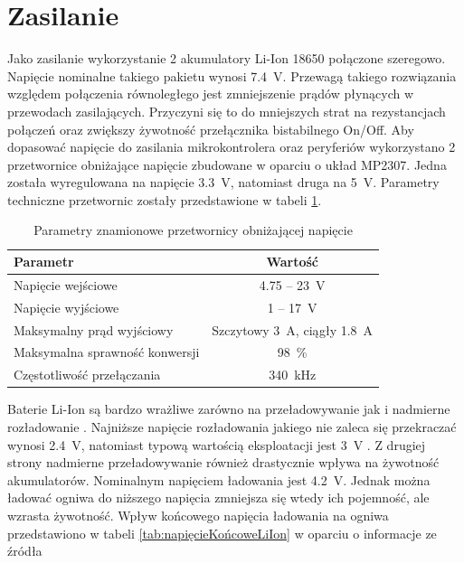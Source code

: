 	\section{Zasilanie}
	
		Jako zasilanie wykorzystanie 2 akumulatory Li-Ion 18650 połączone szeregowo. Napięcie nominalne takiego pakietu wynosi \SI{7.4}{\volt}. Przewagą takiego rozwiązania względem połączenia równoległego jest zmniejszenie prądów płynących w przewodach zasilających. Przyczyni się to do mniejszych strat na rezystancjach połączeń oraz zwiększy żywotność przełącznika bistabilnego On/Off. Aby dopasować napięcie do zasilania mikrokontrolera oraz peryferiów wykorzystano 2 przetwornice obniżające napięcie zbudowane w oparciu o układ MP2307. Jedna została wyregulowana na napięcie \SI{3.3}{\volt}, natomiast druga na \SI{5}{\volt}. Parametry techniczne przetwornic zostały przedstawione w tabeli \ref{tab:PrzetwornicaStepDown}.
		
		\begin{table}[ht]
			\centering
			\begin{tabular}{|l|c|} \hline
				\textbf{Parametr} & \textbf{Wartość} \\
				\hline
				\hline  Napięcie wejściowe & 4.75 -- \SI{23}{\volt}  \\
				\hline 	Napięcie wyjściowe & 1 -- \SI{17}{\volt} \\
				\hline 	Maksymalny prąd wyjściowy & Szczytowy \SI{3}{\ampere}, ciągły \SI{1.8}{\ampere} \\
				\hline 	Maksymalna sprawność konwersji & \SI{98}{\percent} \\
				\hline 	Częstotliwość przełączania & \SI{340}{\kHz} \\
				\hline
			\end{tabular}
			\caption{Parametry znamionowe przetwornicy obniżającej napięcie}
			\label{tab:PrzetwornicaStepDown}
		\end{table}
	
		Baterie Li-Ion są bardzo wrażliwe zarówno na przeładowywanie \cite{ladowanieLiIon} jak i nadmierne rozładowanie \cite{rozladowywanieLiIon1, rozladowywanieLiIon2}. Najniższe napięcie rozładowania jakiego nie zaleca się przekraczać wynosi \SI{2.4}{\volt}, natomiast typową wartością eksploatacji jest \SI{3}{\volt} \cite{rozladowywanieLiIon2}. Z drugiej strony nadmierne przeładowywanie również drastycznie wpływa na żywotność akumulatorów. Nominalnym napięciem ładowania jest \SI{4.2}{\volt}. Jednak można ładować ogniwa do niższego napięcia zmniejsza się wtedy ich pojemność, ale wzrasta żywotność. Wpływ końcowego napięcia ładowania na ogniwa przedstawiono w tabeli \ref{tab:napięcieKońcoweLiIon} w oparciu o informacje ze źródła \cite{ladowanieLiIon}
		
